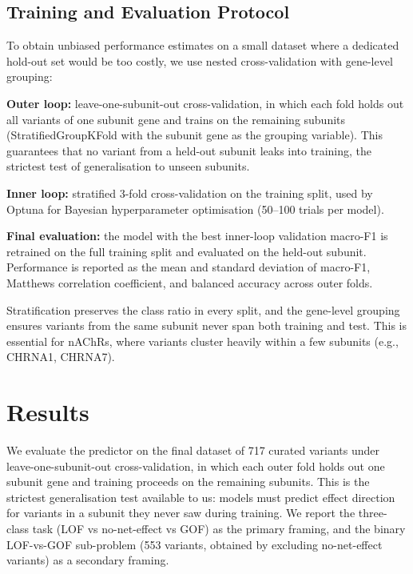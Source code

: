 \documentclass{ws-procs11x85}
\begin{document}
\subsection{Training and Evaluation Protocol}

To obtain unbiased performance estimates on a small dataset where a
dedicated hold-out set would be too costly, we use nested
cross-validation with gene-level grouping:

\begin{arabiclist}[(3)]
\item \textbf{Outer loop:} leave-one-subunit-out cross-validation, in
  which each fold holds out all variants of one subunit gene and trains
  on the remaining subunits (StratifiedGroupKFold with the subunit gene
  as the grouping variable). This guarantees that no variant from a
  held-out subunit leaks into training, the strictest test of
  generalisation to unseen subunits.
\item \textbf{Inner loop:} stratified 3-fold cross-validation on the
  training split, used by Optuna \cite{optuna} for Bayesian
  hyperparameter optimisation (50–100 trials per model).
\item \textbf{Final evaluation:} the model with the best inner-loop
  validation macro-F1 is retrained on the full training split and
  evaluated on the held-out subunit. Performance is reported as the mean
  and standard deviation of macro-F1, Matthews correlation coefficient,
  and balanced accuracy across outer folds.
\end{arabiclist}

Stratification preserves the class ratio in every split, and the
gene-level grouping ensures variants from the same subunit never span
both training and test. This is essential for nAChRs, where variants
cluster heavily within a few subunits (e.g., CHRNA1, CHRNA7).

\section{Results}\label{sec:results}

We evaluate the predictor on the final dataset of 717 curated variants
under leave-one-subunit-out cross-validation, in which each outer fold
holds out one subunit gene and training proceeds on the remaining
subunits. This is the strictest generalisation test available to us:
models must predict effect direction for variants in a subunit they
never saw during training. We report the three-class task (LOF vs
no-net-effect vs GOF) as the primary framing, and the binary LOF-vs-GOF
sub-problem (553 variants, obtained by excluding no-net-effect variants)
as a secondary framing.
\end{document}
